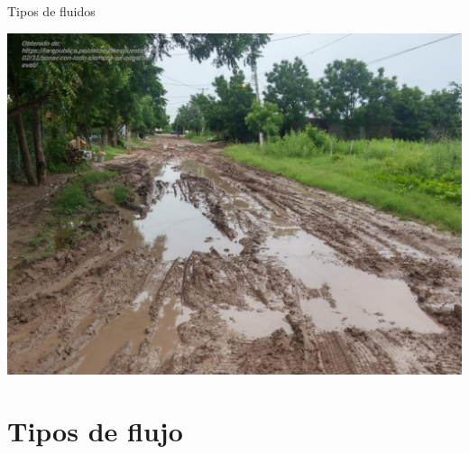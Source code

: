 \documentclass [xcolor=svgnames, t] {beamer}
\begin{document}
\begin{frame}{Tipos de fluidos}
\begin{textblock*}{4cm}
\includegraphics[width=\textwidth]{fnonew4}
\end{textblock*}
\end{frame}

\section{Tipos de flujo}
\end{document}
